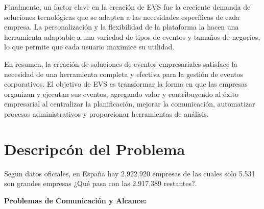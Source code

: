 Finalmente, un factor clave en la creación de EVS fue la creciente demanda de soluciones tecnológicas que se adapten a las 
necesidades específicas de cada empresa. La personalización y la flexibilidad de la plataforma la hacen una herramienta adaptable a 
una variedad de tipos de eventos y tamaños de negocios, lo que permite que cada usuario maximice su utilidad.

En resumen, la creación de soluciones de eventos empresariales satisface la necesidad de una herramienta completa y efectiva para la 
gestión de eventos corporativos. El objetivo de EVS es transformar la forma en que las empresas organizan y ejecutan sus eventos, agregando valor y 
contribuyendo al éxito empresarial al centralizar la planificación, mejorar la comunicación, automatizar procesos administrativos y proporcionar 
herramientas de análisis.

\section{Descripcón del Problema}
Segun datos oficiales, en España hay 2.922.920 empresas de las cuales solo  5.531 son grandes empresas \cite{pymes} ¿Qué pasa con las 2.917.389 restantes?.

\textbf{Problemas de Comunicación y Alcance:}

